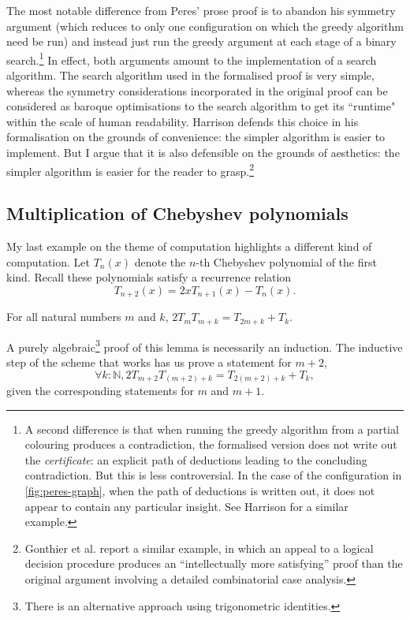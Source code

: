 \documentclass[runningheads]{llncs}
\begin{document}
The most notable difference from Peres' prose proof
is to abandon his
symmetry argument (which reduces to only one configuration
on which the greedy algorithm need be run)
and instead just run the greedy argument at each stage of a binary search.\footnote{
A second difference is that when running the greedy algorithm from a partial colouring produces a contradiction,
the formalised version does not write out the \emph{certificate}:
an explicit path of deductions leading to the concluding contradiction.
But this is less controversial.
In the case of the configuration in \cref{fig:peres-graph},
when the path of deductions is written out,
it does not appear to contain any particular insight.
See Harrison \cite[section 3.4]{Har96} for a similar example.}
In effect, both arguments amount to the implementation of a search algorithm.
The search algorithm used in the formalised proof is very simple,
whereas the symmetry considerations incorporated in the original proof
can be considered as baroque optimisations to the search algorithm
to get its ``runtime" within the scale of human readability.
Harrison \cite[section 3]{Har09} defends this choice in his formalisation on the grounds of convenience:
the simpler algorithm is easier to implement.
But I argue that it is also defensible on the grounds of aesthetics:
the simpler algorithm is easier for the reader to grasp.\footnote{
Gonthier et al. \cite[section 4.3]{Gon13} report a similar example,
in which an appeal to a logical decision procedure
produces an ``intellectually more satisfying'' proof
than the original argument involving a detailed combinatorial case analysis.}

\subsection{Multiplication of Chebyshev polynomials}

My last example on the theme of computation highlights a different kind of computation.
Let $T_n(x)$ denote the $n$-th Chebyshev polynomial of the first kind.  Recall these polynomials
  satisfy a recurrence relation
  \[
    T_{n+2}(x)=2xT_{n+1}(x)-T_n(x).
  \]

\begin{lemma}
  For all natural numbers $m$ and $k$, $2T_mT_{m+k}=T_{2m+k}+T_k$.
\end{lemma}

A purely algebraic\footnote{There is an alternative approach using trigonometric identities.}
proof of this lemma is necessarily an induction.
The 
inductive step of the
scheme that works has us prove a statement for $m+2$,
\[
  \forall k :\mathbb{N}, 2T_{m+2}T_{(m+2)+k}=T_{2(m+2)+k}+T_{k},
\]
given the corresponding statements for $m$ and $m+1$.
\end{document}
